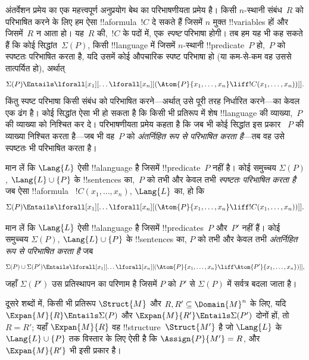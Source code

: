 \documentclass[../../../include/open-logic-section]{subfiles}
\begin{document}


अंतर्वेशन प्रमेय का एक महत्त्वपूर्ण अनुप्रयोग बेथ का परिभाषणीयता प्रमेय
है। किसी $n$-स्थानी संबंध~$R$ को परिभाषित करने के लिए हम ऐसा
!!a{formula}~$!C$ दे सकते हैं जिसमें $n$ मुक्त !!{variable}s हों और
जिसमें~$R$ न आता हो। यह~$R$ की,~$!C$ के पदों में, एक \emph{स्पष्ट}
परिभाषा होगी। तब हम यह भी कह सकते हैं कि कोई सिद्धांत~$\Sigma(P)$,
किसी !!{language} में जिसमें $n$-स्थानी !!{predicate}~$P$ हो,~$P$ को
स्पष्टतः परिभाषित करता है, यदि उसमें कोई
औपचारिक स्पष्ट परिभाषा हो (या कम-से-कम वह उससे तात्पर्यित हो), अर्थात्
\[
\Sigma(P) \Entails \lforall[x_1][\dots
  \lforall[x_n][(\Atom{P}{x_1,\dots, x_n} \liff !C(x_1, \dots,
    x_n))]].
\]
किंतु स्पष्ट परिभाषा किसी संबंध को परिभाषित करने---अर्थात् उसे पूरी तरह
निर्धारित करने---का केवल एक ढंग है। कोई सिद्धांत ऐसा भी हो सकता है कि
किसी भी प्रतिरूप में शेष !!{language} की व्याख्या,~$P$ की व्याख्या को
निश्चित कर दे। परिभाषणीयता प्रमेय कहता है कि जब भी कोई सिद्धांत इस प्रकार
~$P$ की व्याख्या निश्चित करता है---जब भी वह~$P$ को \emph{अंतर्निहित रूप
से परिभाषित करता है}---तब वह उसे स्पष्टतः भी परिभाषित करता है।

\begin{defn}
मान लें कि $\Lang{L}$ ऐसी !!a{language} है जिसमें !!{predicate}~$P$ नहीं
है। कोई समुच्चय $\Sigma(P)$, $\Lang{L}
\cup \{P\}$ के !!{sentence}s का,~$P$ को तभी और केवल तभी
\emph{स्पष्टतः परिभाषित करता है} जब ऐसा !!a{formula}
~$!C(x_1, \dots, x_n)$, $\Lang{L}$ का, हो कि
\[
\Sigma(P) \Entails \lforall[x_1][\dots
  \lforall[x_n][(\Atom{P}{x_1,\dots, x_n} \liff !C(x_1, \dots,
    x_n))]].
\]
\end{defn}

\begin{defn}
मान लें कि $\Lang{L}$ ऐसी !!a{language} है जिसमें !!{predicate}s~$P$
और~$P'$ नहीं हैं। कोई समुच्चय $\Sigma(P)$, $\Lang{L} \cup \{P\}$ के
!!{sentence}s का, $P$ को तभी और केवल तभी \emph{अंतर्निहित रूप से
परिभाषित करता है} जब
\[
\Sigma(P) \cup \Sigma(P') \Entails \lforall[x_1][\dots
  \lforall[x_n][(\Atom{P}{x_1,\dots, x_n} \liff \Atom{P'}{x_1,\dots,
      x_n})]],
\]
जहाँ $\Sigma(P')$ उस प्रतिस्थापन का परिणाम है जिसमें $P$ को $P'$ से
$\Sigma(P)$ में सर्वत्र बदला जाता है।
\end{defn}

दूसरे शब्दों में, किसी भी प्रतिरूप $\Struct{M}$ और $R, R' \subseteq
\Domain{M}^n$ के लिए, यदि $\Expan{M}{R} \Entails \Sigma(P)$ और
$\Expan{M}{R'} \Entails \Sigma(P')$ दोनों हों, तो $R=R'$; यहाँ
$\Expan{M}{R}$ वह !!{structure}~$\Struct{M'}$ है जो $\Lang{L}$ के
$\Lang{L} \cup \{P\}$ तक विस्तार के लिए ऐसी है कि
$\Assign{P}{M'} = R$, और
$\Expan{M}{R'}$ भी इसी प्रकार है।
\end{document}

